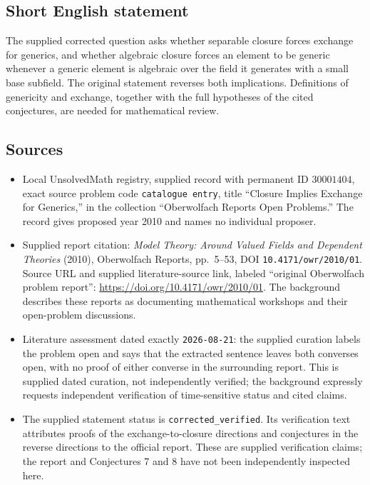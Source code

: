 \documentclass[11pt]{article}
\begin{document}
\subsection{Short English statement}
The supplied corrected question asks whether separable closure forces exchange for generics, and whether algebraic closure forces an element to be generic whenever a generic element is algebraic over the field it generates with a small base subfield. The original statement reverses both implications. Definitions of genericity and exchange, together with the full hypotheses of the cited conjectures, are needed for mathematical review.
\subsection{Sources}
\begin{itemize}
\item Local UnsolvedMath registry, supplied record with permanent ID \(30001404\), exact source problem code \texttt{catalogue entry}, title ``Closure Implies Exchange for Generics,'' in the collection ``Oberwolfach Reports Open Problems.'' The record gives proposed year 2010 and names no individual proposer.
\item Supplied report citation: \emph{Model Theory: Around Valued Fields and Dependent Theories} (2010), Oberwolfach Reports, pp.\ 5--53, DOI \texttt{10.4171/owr/2010/01}. Source URL and supplied literature-source link, labeled ``original Oberwolfach problem report'': \url{https://doi.org/10.4171/owr/2010/01}. The background describes these reports as documenting mathematical workshops and their open-problem discussions.
\item Literature assessment dated exactly \texttt{2026-08-21}: the supplied curation labels the problem open and says that the extracted sentence leaves both converses open, with no proof of either converse in the surrounding report. This is supplied dated curation, not independently verified; the background expressly requests independent verification of time-sensitive status and cited claims.
\item The supplied statement status is \texttt{corrected\_verified}. Its verification text attributes proofs of the exchange-to-closure directions and conjectures in the reverse directions to the official report. These are supplied verification claims; the report and Conjectures 7 and 8 have not been independently inspected here.
\end{itemize}
\end{document}
